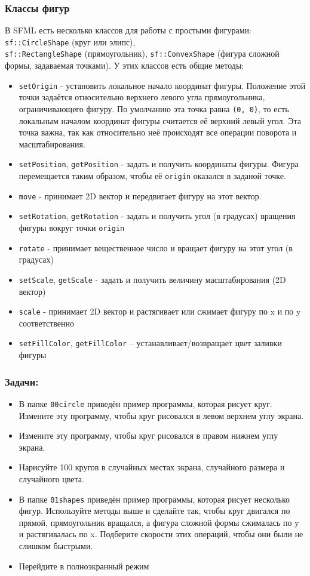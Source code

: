 \documentclass{article}
\begin{document}
\subsubsection*{Классы фигур}
В SFML есть несколько классов для работы с простыми фигурами: \texttt{sf::CircleShape} (круг или элипс),\\ \texttt{sf::RectangleShape} (прямоугольник), \texttt{sf::ConvexShape} (фигура сложной формы, задаваемая точками). У этих классов есть общие методы:
\begin{itemize}
\item \texttt{setOrigin} - установить локальное начало координат фигуры. Положение этой точки задаётся относительно верхнего левого угла прямоугольника, ограничивающего фигуру. По умолчанию эта точка равна \texttt{(0, 0)}, то есть локальным началом координат фигуры считается её верхний левый угол.  Эта точка важна, так как относительно неё происходят все операции поворота и масштабирования.
\item \texttt{setPosition}, \texttt{getPosition} - задать и получить координаты фигуры. Фигура перемещается таким образом, чтобы её \texttt{origin} оказался в заданой точке.
\item \texttt{move} - принимает 2D вектор и передвигает фигуру на этот вектор.
\item \texttt{setRotation}, \texttt{getRotation} - задать и получить угол (в градусах) вращения фигуры вокруг точки \texttt{origin}
\item \texttt{rotate} - принимает вещественное число и вращает фигуру на этот угол (в градусах)
\item \texttt{setScale}, \texttt{getScale} - задать и получить величину масштабирования (2D вектор)
\item \texttt{scale} - принимает  2D вектор и растягивает или сжимает фигуру по x и по y соответственно
\item \texttt{setFillColor}, \texttt{getFillColor} -- устанавливает/возвращает цвет заливки фигуры
\end{itemize}

\subsubsection*{Задачи:}
\begin{itemize}
\item В папке \texttt{00circle} приведён пример программы, которая рисует круг. Измените эту программу, чтобы круг рисовался в левом верхнем углу экрана.
\item Измените эту программу, чтобы круг рисовался в правом нижнем углу экрана.
\item Нарисуйте 100 кругов в случайных местах экрана, случайного размера и случайного цвета.
\item В папке \texttt{01shapes} приведён пример программы, которая рисует несколько фигур. Используйте методы выше и сделайте так, чтобы круг двигался по прямой, прямоугольник вращался, а фигура сложной формы сжималась по y и растягивалась по x. Подберите скорости этих операций, чтобы они были не слишком быстрыми.
\item Перейдите в полноэкранный режим
\end{itemize}
\end{document}
